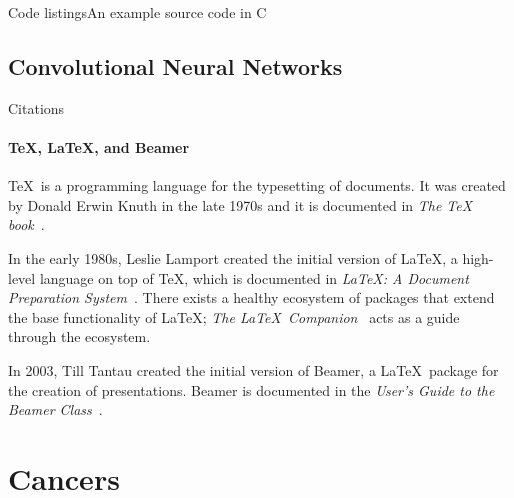\documentclass{beamer}
\begin{document}
    \begin{frame}{Code listings}{An example source code in C}
      \sleepSort
    \end{frame}

    \subsection{Convolutional Neural Networks}
    \begin{frame}[label=citations]{Citations}
      \framesubtitle{\TeX, \LaTeX, and Beamer}

      \justifying\TeX\ is a programming language for the typesetting
      of documents. It was created by Donald Erwin Knuth in the late
      1970s and it is documented in \emph{The \TeX
      book}~\cite{knuth84}.

      In the early 1980s, Leslie Lamport created the initial version
      of \LaTeX, a high-level language on top of \TeX, which is
      documented in \emph{\LaTeX : A Document Preparation
      System}~\cite{lamport94}. There exists a healthy ecosystem of
      packages that extend the base functionality of \LaTeX;
      \emph{The \LaTeX\ Companion}~\cite{MG94} acts as a guide
      through the ecosystem.

      In 2003, Till Tantau created the initial version of Beamer, a
      \LaTeX\ package for the creation of presentations. Beamer is
      documented in the \emph{User's Guide to the Beamer
      Class}~\cite{tantau04}.
    \end{frame}

    \section{Cancers}
\end{document}
